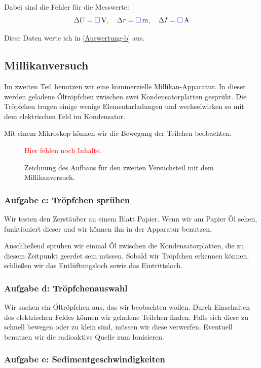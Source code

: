 \documentclass[11pt]{article}
\newcommand{\fehlt}{\textcolor{red}{Hier fehlen noch Inhalte.}}
\newcommand{\messwert}{\textcolor{blue}{\square}}
\begin{document}
Dabei sind die Fehler für die Messwerte:
\[
	\Delta U = \unit[\messwert] V,
	\quad
	\Delta r = \unit[\messwert] m,
	\quad
	\Delta I = \unit[\messwert] A
\]

Diese Daten werte ich in \ref{Auswertung-b} aus.

\subsection{Millikanversuch}

Im zweiten Teil benutzen wir eine kommerzielle Millikan-Apparatur. In dieser
werden geladene Öltröpfchen zwischen zwei Kondensatorplatten gesprüht. Die
Tröpfchen tragen einige wenige Elementarladungen und wechselwirken so mit dem
elektrischen Feld im Kondensator.

Mit einem Mikroskop können wir die Bewegung der Teilchen beobachten.

\begin{figure}[h!]
	\centering
	\fehlt
	\caption{Zeichnung des Aufbaus für den zweiten Versuchsteil mit dem
	Millikanversuch.}
	\label{fig:Millikanversuch}
\end{figure}

\subsubsection{Aufgabe c: Tröpfchen sprühen}

Wir testen den Zerstäuber an einem Blatt Papier. Wenn wir am Papier Öl sehen,
funktioniert dieser und wir können ihn in der Apparatur benutzen.

Anschließend sprühen wir einmal Öl zwischen die Kondensatorplatten, die zu
diesem Zeitpunkt geerdet sein müssen. Sobald wir Tröpfchen erkennen können,
schließen wir das Entlüftungsloch sowie das Eintrittsloch.

\subsubsection{Aufgabe d: Tröpfchenauswahl}

Wir suchen ein Öltröpfchen aus, das wir beobachten wollen. Durch Einschalten
des elektrischen Feldes können wir geladene Teilchen finden. Falls sich diese
zu schnell bewegen oder zu klein sind, müssen wir diese verwerfen. Eventuell
benutzen wir die radioaktive Quelle zum Ionisieren.

\subsubsection{Aufgabe e: Sedimentgeschwindigkeiten}
\end{document}
